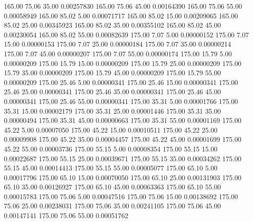     165.00     75.06     35.00     0.00257830
    165.00     75.06     45.00     0.00164390
    165.00     75.06     55.00     0.00058949
    165.00     85.02      5.00     0.00071717
    165.00     85.02     15.00     0.00209065
    165.00     85.02     25.00     0.00345923
    165.00     85.02     35.00     0.00355102
    165.00     85.02     45.00     0.00230054
    165.00     85.02     55.00     0.00082639
    175.00      7.07      5.00     0.00000152
    175.00      7.07     15.00     0.00000153
    175.00      7.07     25.00     0.00000184
    175.00      7.07     35.00     0.00000214
    175.00      7.07     45.00     0.00000207
    175.00      7.07     55.00     0.00000174
    175.00     15.79      5.00     0.00000209
    175.00     15.79     15.00     0.00000209
    175.00     15.79     25.00     0.00000209
    175.00     15.79     35.00     0.00000209
    175.00     15.79     45.00     0.00000209
    175.00     15.79     55.00     0.00000209
    175.00     25.46      5.00     0.00000341
    175.00     25.46     15.00     0.00000341
    175.00     25.46     25.00     0.00000341
    175.00     25.46     35.00     0.00000341
    175.00     25.46     45.00     0.00000341
    175.00     25.46     55.00     0.00000341
    175.00     35.31      5.00     0.00001766
    175.00     35.31     15.00     0.00002179
    175.00     35.31     25.00     0.00001446
    175.00     35.31     35.00     0.00000494
    175.00     35.31     45.00     0.00000663
    175.00     35.31     55.00     0.00001169
    175.00     45.22      5.00     0.00007050
    175.00     45.22     15.00     0.00010511
    175.00     45.22     25.00     0.00009908
    175.00     45.22     35.00     0.00004457
    175.00     45.22     45.00     0.00001699
    175.00     45.22     55.00     0.00003736
    175.00     55.15      5.00     0.00008354
    175.00     55.15     15.00     0.00022687
    175.00     55.15     25.00     0.00039671
    175.00     55.15     35.00     0.00034262
    175.00     55.15     45.00     0.00014413
    175.00     55.15     55.00     0.00005077
    175.00     65.10      5.00     0.00017796
    175.00     65.10     15.00     0.00070050
    175.00     65.10     25.00     0.00131903
    175.00     65.10     35.00     0.00126927
    175.00     65.10     45.00     0.00063363
    175.00     65.10     55.00     0.00015783
    175.00     75.06      5.00     0.00047516
    175.00     75.06     15.00     0.00138692
    175.00     75.06     25.00     0.00238031
    175.00     75.06     35.00     0.00241105
    175.00     75.06     45.00     0.00147141
    175.00     75.06     55.00     0.00051762
